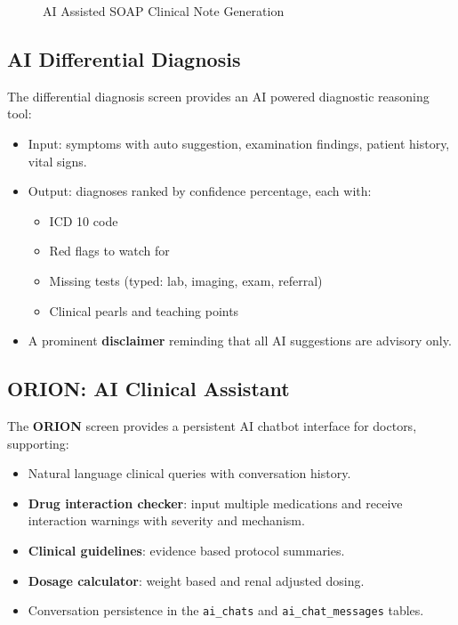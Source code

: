 \documentclass[12pt,a4paper,oneside]{report}
\begin{document}
\begin{figure}[H]
    \centering
    \caption{AI Assisted SOAP Clinical Note Generation}
    \label{fig:screen clinical notes}
\end{figure}

\subsection{AI Differential Diagnosis}

The differential diagnosis screen provides an AI powered diagnostic reasoning tool:

\begin{itemize}
    \item Input: symptoms with auto suggestion, examination findings, patient history, vital signs.
    \item Output: diagnoses ranked by confidence percentage, each with:
    \begin{itemize}
        \item ICD 10 code
        \item Red flags to watch for
        \item Missing tests (typed: lab, imaging, exam, referral)
        \item Clinical pearls and teaching points
    \end{itemize}
    \item A prominent \textbf{disclaimer} reminding that all AI suggestions are advisory only.
\end{itemize}

\subsection{ORION: AI Clinical Assistant}

The \textbf{ORION} screen provides a persistent AI chatbot interface for doctors, supporting:

\begin{itemize}
    \item Natural language clinical queries with conversation history.
    \item \textbf{Drug interaction checker}: input multiple medications and receive interaction warnings with severity and mechanism.
    \item \textbf{Clinical guidelines}: evidence based protocol summaries.
    \item \textbf{Dosage calculator}: weight based and renal adjusted dosing.
    \item Conversation persistence in the \texttt{ai\_chats} and \texttt{ai\_chat\_messages} tables.
\end{itemize}
\end{document}
